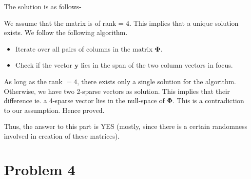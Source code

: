 \documentclass[a4paper,11pt]{article}
\numberwithin{definition}{section}
\numberwithin{mytheorem}{subsection}
\begin{document}
The solution is as follows-

We assume that the matrix is of rank = 4. This implies that a unique solution exists. We follow the following algorithm.

\begin{itemize}
    \item Iterate over all pairs of columns in the matrix $\boldsymbol{\Phi}$.
    \item Check if the vector $\boldsymbol{y}$ lies in the span of the two column vectors in focus.
\end{itemize}

As long as the rank $= 4$, there exists only a single solution for the algorithm.
Otherwise, we have two 2-sparse vectors as solution. This implies that their difference ie. a 4-sparse vector lies in the null-space of $\boldsymbol{\Phi}$. This is a contradiction to our assumption. Hence proved.

Thus, the answer to this part is YES (mostly, since there is a certain randomness involved in creation of these matrices).


\newpage


\section{Problem 4}
\end{document}
